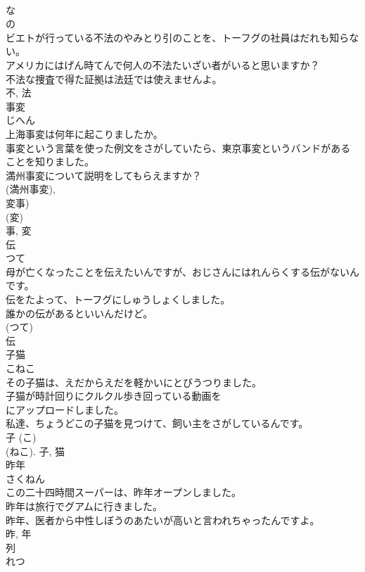 \documentclass[8pt]{extreport}
\begin{document}
\begin{CJK}{UTF8}{min}
\\	な 
\\	の 
\\	ビエトが行っている不法のやみとり引のことを、トーフグの社員はだれも知らない。	
\\	アメリカにはげん時てんで何人の不法たいざい者がいると思いますか？	
\\	不法な捜査で得た証拠は法廷では使えませんよ。	
\\	不, 法	
\\	事変	
\\	じへん	
\\	上海事変は何年に起こりましたか。	
\\	事変という言葉を使った例文をさがしていたら、東京事変というバンドがあることを知りました。	
\\	満州事変について説明をしてもらえますか？	
\\	(満州事変), 
\\	変事) 
\\	(変) 
\\	事, 変	
\\	伝	
\\	つて	
\\	母が亡くなったことを伝えたいんですが、おじさんにはれんらくする伝がないんです。	
\\	伝をたよって、トーフグにしゅうしょくしました。	
\\	誰かの伝があるといいんだけど。	
\\	(つて) 
\\	伝	
\\	子猫	
\\	こねこ	
\\	その子猫は、えだからえだを軽かいにとびうつりました。	
\\	子猫が時計回りにクルクル歩き回っている動画を
\\	にアップロードしました。	
\\	私達、ちょうどこの子猫を見つけて、飼い主をさがしているんです。	
\\	子 (こ) 
\\	(ねこ).	子, 猫	
\\	昨年	
\\	さくねん	
\\	この二十四時間スーパーは、昨年オープンしました。	
\\	昨年は旅行でグアムに行きました。	
\\	昨年、医者から中性しぼうのあたいが高いと言われちゃったんですよ。	
\\	昨, 年	
\\	列	
\\	れつ	

\end{CJK}
\end{document}
